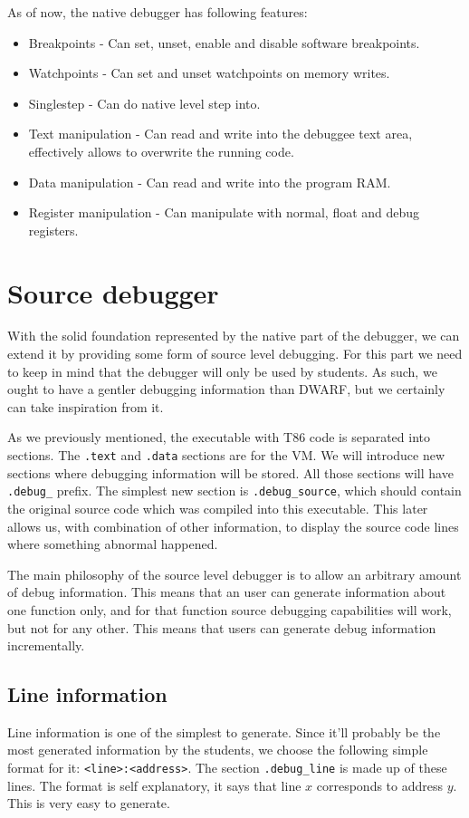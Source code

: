 As of now, the native debugger has following features:
\begin{itemize}
    \item Breakpoints - Can set, unset, enable and disable software breakpoints.
    \item Watchpoints - Can set and unset watchpoints on memory writes.
    \item Singlestep - Can do native level step into.
    \item Text manipulation - Can read and write into the debuggee text area,
        effectively allows to overwrite the running code.
    \item Data manipulation - Can read and write into the program RAM.
    \item Register manipulation - Can manipulate with normal, float and debug registers.
\end{itemize}

\section{Source debugger}
With the solid foundation represented by the native part of the debugger, we
can extend it by providing some form of source level debugging. For this part
we need to keep in mind that the debugger will only be used by students.
As such, we ought to have a gentler debugging information than DWARF,
but we certainly can take inspiration from it.

As we previously mentioned, the executable with T86 code is separated into sections.
The \texttt{.text} and \texttt{.data} sections are for the VM. We will introduce new
sections where debugging information will be stored. All those sections will have
\texttt{.debug\_} prefix. The simplest new section is \texttt{.debug\_source}, which
should contain the original source code which was compiled into this executable.
This later allows us, with combination of other information, to display the source
code lines where something abnormal happened.

The main philosophy of the source level debugger is to allow an arbitrary
amount of debug information. This means that an user can generate information
about one function only, and for that function source debugging capabilities
will work, but not for any other. This means that users can generate debug
information incrementally.

\subsection{Line information}
Line information is one of the simplest to generate. Since it'll probably be
the most generated information by the students, we choose the following simple
format for it: \texttt{<line>:<address>}. The section \texttt{.debug\_line} is
made up of these lines. The format is self explanatory, it says that line $x$
corresponds to address $y$. This is very easy to generate.

